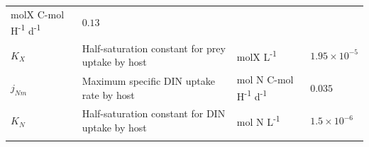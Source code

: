 \documentclass[]{elsarticle} %
\begin{document}
\begin{longtable}[]{@{}llll@{}}
\begin{minipage}[t]{0.24\columnwidth}
molX C-mol H\textsuperscript{-1} d\textsuperscript{-1}\strut
\end{minipage} & \begin{minipage}[t]{0.09\columnwidth}\raggedright\strut
\(0.13\)\strut
\end{minipage}\tabularnewline
\begin{minipage}[t]{0.09\columnwidth}\raggedright\strut
\(K_X\)\strut
\end{minipage} & \begin{minipage}[t]{0.46\columnwidth}\raggedright\strut
Half-saturation constant for prey uptake by host\strut
\end{minipage} & \begin{minipage}[t]{0.24\columnwidth}\raggedright\strut
molX L\textsuperscript{-1}\strut
\end{minipage} & \begin{minipage}[t]{0.09\columnwidth}\raggedright\strut
\(1.95\times 10^{-5}\)\strut
\end{minipage}\tabularnewline
\begin{minipage}[t]{0.09\columnwidth}\raggedright\strut
\(j_{Nm}\)\strut
\end{minipage} & \begin{minipage}[t]{0.46\columnwidth}\raggedright\strut
Maximum specific DIN uptake rate by host\strut
\end{minipage} & \begin{minipage}[t]{0.24\columnwidth}\raggedright\strut
mol N C-mol H\textsuperscript{-1} d\textsuperscript{-1}\strut
\end{minipage} & \begin{minipage}[t]{0.09\columnwidth}\raggedright\strut
\(0.035\)\strut
\end{minipage}\tabularnewline
\begin{minipage}[t]{0.09\columnwidth}\raggedright\strut
\(K_N\)\strut
\end{minipage} & \begin{minipage}[t]{0.46\columnwidth}\raggedright\strut
Half-saturation constant for DIN uptake by host\strut
\end{minipage} & \begin{minipage}[t]{0.24\columnwidth}\raggedright\strut
mol N L\textsuperscript{-1}\strut
\end{minipage} & \begin{minipage}[t]{0.09\columnwidth}\raggedright\strut
\(1.5\times 10^{-6}\)\strut
\end{minipage}\tabularnewline
\begin{minipage}[t]{0.09\columnwidth}\raggedright\strut

\end{minipage}
\end{longtable}
\end{document}
